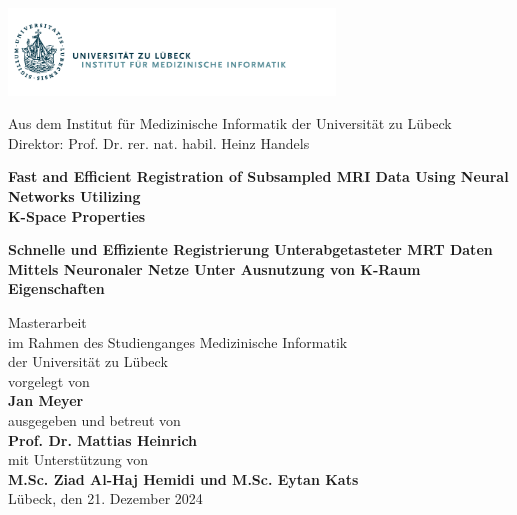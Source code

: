 
\addtolength{\topmargin}{-1.2cm} 
\addtolength{\textwidth}{2.35cm} 

\vspace*{-2.7cm}
\hspace*{-2cm}
\includegraphics[width=0.65\textwidth]{./images/Logo_IMI}
\vspace*{0.4cm}
\begin{center}


\enlargethispage{5cm}
Aus dem Institut für Medizinische Informatik 
der Universität zu Lübeck\\
Direktor: Prof. Dr. rer. nat. habil. Heinz Handels\\[1.8cm]

\begin{Large}
\textcolor{Ocean}{{\textbf{Fast and Efficient Registration of Subsampled MRI Data Using Neural Networks Utilizing\\K-Space Properties} }}\\ 
\end{Large}
\vspace*{1.5cm}
\begin{large}
{{\textbf{Schnelle und Effiziente Registrierung Unterabgetasteter MRT Daten Mittels Neuronaler Netze Unter Ausnutzung von K-Raum Eigenschaften} }}\\ 
\end{large}
\vspace*{2.5cm}
%
Masterarbeit\\ 
im Rahmen des Studienganges Medizinische Informatik\\
der Universität zu Lübeck\\[1.0cm]
%
vorgelegt von\\[0.1cm]
\textbf{Jan Meyer}\\[1.0cm]
%
ausgegeben und betreut von\\[0.1cm]
\textbf{Prof. Dr. Mattias Heinrich}\\[0.3cm]
mit Unterstützung von\\[0.1cm]
\textbf{M.Sc. Ziad Al-Haj Hemidi und M.Sc. Eytan Kats}\\[2.8cm]
%
Lübeck, den 21. Dezember 2024
\end{center}
  
